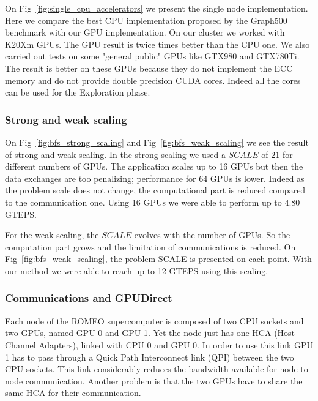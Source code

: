 On Fig~\ref{fig:single_cpu_accelerators} we present the single node implementation. 
Here we compare the best CPU implementation proposed by the Graph500 benchmark with our GPU implementation. 
On our cluster we worked with K20Xm GPUs. 
The GPU result is twice times better than the CPU one. 
We also carried out tests on some "general public" GPUs like GTX980 and GTX780Ti. 
The result is better on these GPUs because they do not implement the ECC memory and do not provide double precision CUDA cores. 
Indeed all the cores can be used for the Exploration phase. 



\subsubsection{Strong and weak scaling}

On Fig~\ref{fig:bfs_strong_scaling} and Fig~\ref{fig:bfs_weak_scaling} we see the result of strong and weak scaling. 
In the strong scaling we used a $SCALE$ of $21$ for different numbers of GPUs. 
The application scales up to 16 GPUs but then the data exchanges are too penalizing;
performance for 64 GPUs is lower. 
Indeed as the problem scale does not change, the computational part is reduced compared to the communication one. 
Using 16 GPUs we were able to perform up to 4.80 GTEPS. 


For the weak scaling, the $SCALE$ evolves with the number of GPUs. 
So the computation part grows and the limitation of communications is reduced. 
On Fig~\ref{fig:bfs_weak_scaling}, the problem SCALE is presented on each point. 
With our method we were able to reach up to 12 GTEPS using this scaling. 


\subsubsection{Communications and GPUDirect}

Each node of the ROMEO supercomputer is composed of two CPU sockets and two GPUs, named GPU 0 and GPU 1.
Yet the node just has one HCA (Host Channel Adapters), linked with CPU 0 and GPU 0. 
In order to use this link GPU 1 has to pass through a Quick Path Interconnect link (QPI) between the two CPU sockets. 
This link considerably reduces the bandwidth available for node-to-node communication. 
Another problem is that the two GPUs have to share the same HCA for their communication. 


